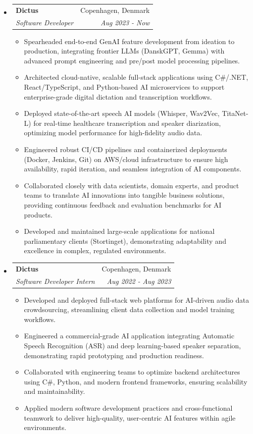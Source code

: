 \documentclass[letterpaper,11pt]{article}
\makeatletter
\newcommand{\resitem}[1]{\item #1 \vspace{-2pt}}
\newcommand{\ressubheading}[4]{
    \begin{tabular*}{6.5in}{p{4.8in}@{\extracolsep{\fill}}r}
            \textbf{#1} & #2 \\
            \textit{#3} & \textit{#4} \\
    \end{tabular*}\vspace{-8pt}}
\makeatother
\begin{document}
      \begin{itemize}
        \item \ressubheading{Dictus}{Copenhagen, Denmark}{Software Developer}{Aug 2023 - Now}
        \begin{itemize}
            \resitem{Spearheaded end-to-end GenAI feature development from ideation to production, integrating frontier LLMs (DanskGPT, Gemma) with advanced prompt engineering and pre/post model processing pipelines.}
            \resitem{Architected cloud-native, scalable full-stack applications using C\#/.NET, React/TypeScript, and Python-based AI microservices to support enterprise-grade digital dictation and transcription workflows.}
            \resitem{Deployed state-of-the-art speech AI models (Whisper, Wav2Vec, TitaNet-L) for real-time healthcare transcription and speaker diarization, optimizing model performance for high-fidelity audio data.}
            \resitem{Engineered robust CI/CD pipelines and containerized deployments (Docker, Jenkins, Git) on AWS/cloud infrastructure to ensure high availability, rapid iteration, and seamless integration of AI components.}
            \resitem{Collaborated closely with data scientists, domain experts, and product teams to translate AI innovations into tangible business solutions, providing continuous feedback and evaluation benchmarks for AI products.}
            \resitem{Developed and maintained large-scale applications for national parliamentary clients (Stortinget), demonstrating adaptability and excellence in complex, regulated environments.}
        \end{itemize}
        \item \ressubheading{Dictus}{Copenhagen, Denmark}{Software Developer Intern}{Aug 2022 - Aug 2023}
        \begin{itemize}
            \resitem{Developed and deployed full-stack web platforms for AI-driven audio data crowdsourcing, streamlining client data collection and model training workflows.}
            \resitem{Engineered a commercial-grade AI application integrating Automatic Speech Recognition (ASR) and deep learning-based speaker separation, demonstrating rapid prototyping and production readiness.}
            \resitem{Collaborated with engineering teams to optimize backend architectures using C\#, Python, and modern frontend frameworks, ensuring scalability and maintainability.}
            \resitem{Applied modern software development practices and cross-functional teamwork to deliver high-quality, user-centric AI features within agile environments.}

\end{itemize}
\end{itemize}
\end{document}
